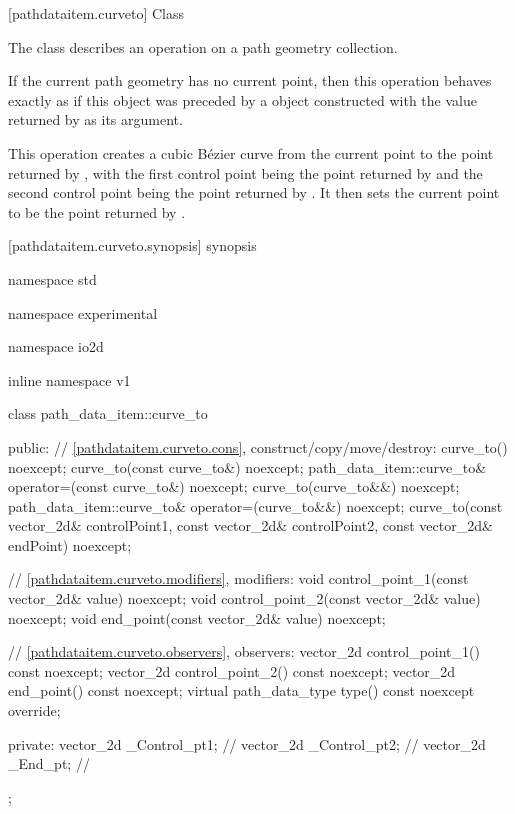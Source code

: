  [pathdataitem.curveto] {Class }

\pnum
{}
The class  describes an operation on a path geometry collection.

\pnum
If the current path geometry has no current point, then this operation behaves exactly as if this object was preceded by a  object constructed with the value returned by  as its argument.

\pnum
This operation creates a cubic B\'ezier curve from the current point to the point returned by , with the first control point being the point returned by  and the second control point being the point returned by . It then sets the current point to be the point returned by .

 [pathdataitem.curveto.synopsis] { synopsis}

\begin{codeblock}
namespace std { namespace experimental { namespace io2d { inline namespace v1 {
  class path_data_item::curve_to {
  public:
    // \ref{pathdataitem.curveto.cons}, construct/copy/move/destroy:
    curve_to() noexcept;
    curve_to(const curve_to&) noexcept;
    path_data_item::curve_to& operator=(const curve_to&) noexcept;
    curve_to(curve_to&&) noexcept;
    path_data_item::curve_to& operator=(curve_to&&) noexcept;
    curve_to(const vector_2d& controlPoint1, const vector_2d& controlPoint2,
      const vector_2d& endPoint) noexcept;

    // \ref{pathdataitem.curveto.modifiers}, modifiers:
    void control_point_1(const vector_2d& value) noexcept;
    void control_point_2(const vector_2d& value) noexcept;
    void end_point(const vector_2d& value) noexcept;


    // \ref{pathdataitem.curveto.observers}, observers:
    vector_2d control_point_1() const noexcept;
    vector_2d control_point_2() const noexcept;
    vector_2d end_point() const noexcept;
    virtual path_data_type type() const noexcept override;
    
  private:
    vector_2d _Control_pt1; // \expos
    vector_2d _Control_pt2; // \expos
    vector_2d _End_pt;      // \expos
  };
} } } }
\end{codeblock}

